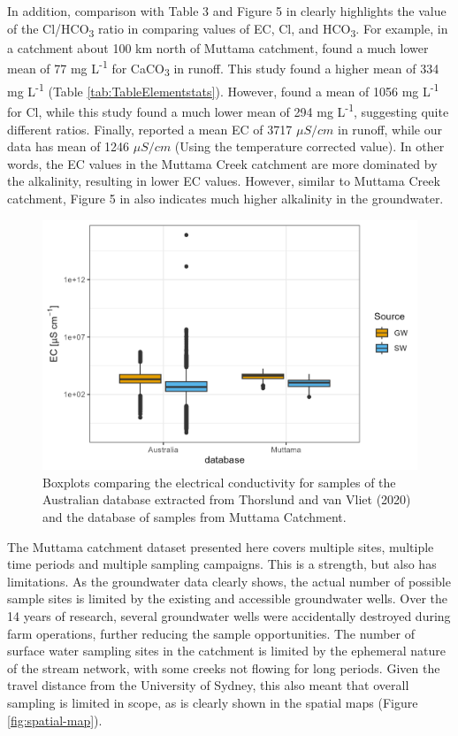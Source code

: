 \documentclass[, manuscript]{copernicus}
\begin{document}
In addition, comparison with Table 3 and Figure 5 in \citet{Hughes2007}
clearly highlights the value of the Cl/HCO\textsubscript{3} ratio in
comparing values of EC, Cl, and HCO\textsubscript{3}. For example, in a
catchment about 100 km north of Muttama catchment, \citet{Hughes2007}
found a much lower mean of 77 mg L\textsuperscript{-1} for
CaCO\textsubscript{3} in runoff. This study found a higher mean of 334
mg L\textsuperscript{-1} (Table \ref{tab:TableElementstats}). However,
\citet{Hughes2007} found a mean of 1056 mg L\textsuperscript{-1} for Cl,
while this study found a much lower mean of 294 mg
L\textsuperscript{-1}, suggesting quite different ratios. Finally,
\citet{Hughes2007} reported a mean EC of 3717 \(\mu S/cm\) in runoff,
while our data has mean of 1246 \(\mu S/cm\) (Using the temperature
corrected value). In other words, the EC values in the Muttama Creek
catchment are more dominated by the alkalinity, resulting in lower EC
values. However, similar to Muttama Creek catchment, Figure 5 in
\citet{Hughes2007} also indicates much higher alkalinity in the
groundwater.

\begin{figure}
\includegraphics[width=0.8\linewidth]{Figures/globalboxplot} \caption{Boxplots comparing the electrical conductivity for samples of the Australian database extracted from Thorslund and van Vliet (2020) and the database of samples from Muttama Catchment.}\label{fig:global-plot}
\end{figure}

The Muttama catchment dataset presented here covers multiple sites,
multiple time periods and multiple sampling campaigns. This is a
strength, but also has limitations. As the groundwater data clearly
shows, the actual number of possible sample sites is limited by the
existing and accessible groundwater wells. Over the 14 years of
research, several groundwater wells were accidentally destroyed during
farm operations, further reducing the sample opportunities. The number
of surface water sampling sites in the catchment is limited by the
ephemeral nature of the stream network, with some creeks not flowing for
long periods. Given the travel distance from the University of Sydney,
this also meant that overall sampling is limited in scope, as is clearly
shown in the spatial maps (Figure \ref{fig:spatial-map}).
\end{document}
